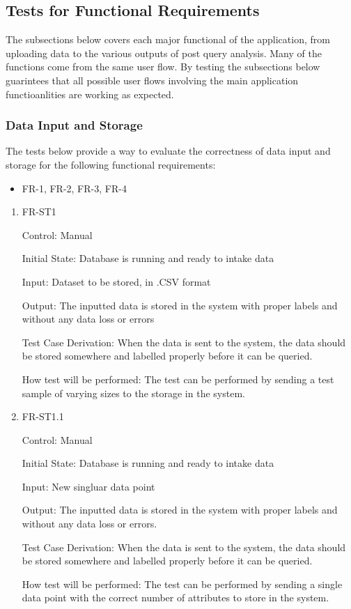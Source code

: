 \documentclass[12pt, titlepage]{article}
\begin{document}
\subsection{Tests for Functional Requirements}

The subsections below covers each major functional of the application, from
uploading data to the various outputs of post query analysis. Many of the
functions come from the same user flow. By testing the subsections below
guarintees that all possible user flows involving the main application
functioanlities are working as expected. 

\subsubsection{Data Input and Storage}
The tests below provide a way to evaluate the correctness of data input and
storage for the following functional requirements:
\begin{itemize}
  \item FR-1, FR-2, FR-3, FR-4
\end{itemize}

\begin{enumerate}

\item{FR-ST1}

Control: Manual
					
Initial State: Database is running and ready to intake data
					
Input: Dataset to be stored, in .CSV format
					
Output: The inputted data is stored in the system with proper labels and without
any data loss or errors

Test Case Derivation: When the data is sent to the system, the data should be
stored somewhere and labelled properly before it can be queried.
					
How test will be performed: The test can be performed by sending a test sample
of varying sizes to the storage in the system.

\item {FR-ST1.1}

Control: Manual
					
Initial State: Database is running and ready to intake data
					
Input: New singluar data point 
					
Output: The inputted data is stored in the system with proper labels and without
any data loss or errors.

Test Case Derivation: When the data is sent to the system, the data should be
stored somewhere and labelled properly before it can be queried.
					
How test will be performed: The test can be performed by sending a single data
point with the correct number of attributes to store in
the system.

\end{enumerate}
\end{document}
